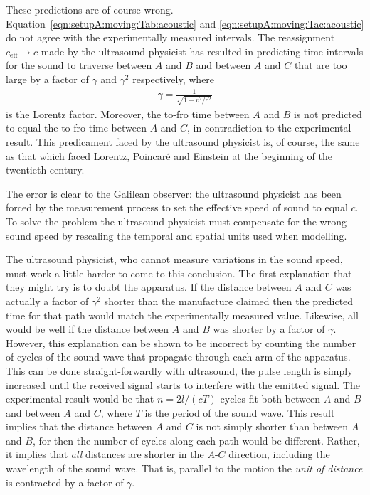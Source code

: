 \documentclass[10pt, fleqn,final,showtrims,oldfontcommands, article,a4paper,oneside]{memoir} %
\newcommand{\eqnref}[1]{\ref{eqn:#1}}
\newcommand{\lr}[1]{\left( #1 \right)}
\newcommand{\Poincare}{Poincar{\'e}\xspace}
\newcommand{\eff}{{\textrm{eff}}}
\begin{document}
These predictions are of course wrong.
Equation~\ref{eqn:setupA:moving:Tab:acoustic} and \ref{eqn:setupA:moving:Tac:acoustic} do not agree with the
experimentally measured intervals.
The reassignment $c_\eff \rightarrow c$ made by the ultrasound physicist 
has resulted in predicting time intervals for the sound to traverse between $A$ and $B$ and between $A$ and $C$ that are too large
by a factor of $\gamma$ and $\gamma^2$ respectively,
where 
\begin{align}
  \gamma = \frac{1}{\sqrt{1-v^2/c^2}}
  \label{eqn:gamma}
\end{align}
is the Lorentz factor.
Moreover, the to-fro time between $A$ and $B$ is not predicted to equal  the to-fro time between $A$ and $C$,
in contradiction to the  experimental result.
This predicament faced by the ultrasound physicist  is, of course, the same as that which faced Lorentz, \Poincare and Einstein at the beginning  of the twentieth century.



The error is clear to the Galilean observer:
the ultrasound physicist has been forced by the measurement process to  set the effective speed of sound to equal $c$.
To solve the problem the ultrasound physicist  must  compensate for the wrong sound speed by rescaling the temporal and spatial units  used when modelling.

The ultrasound physicist, who cannot measure variations in the sound speed,
must work a little harder to come to this conclusion.
The first explanation that they might try  is to doubt the apparatus.
If the distance between $A$ and $C$  was actually a factor of  $\gamma^2$ shorter than the manufacture claimed then the predicted time for that path would match the 
experimentally measured value.
Likewise, all would be well if the distance between $A$ and $B$  was shorter by a factor of $\gamma$.
However, this explanation can be shown to be incorrect by  counting  the number of cycles of the sound wave that propagate through each arm of the apparatus.
This can be done straight-forwardly with ultrasound,
the  pulse length is simply increased until the received signal starts to interfere with the emitted signal.
The experimental result would be that  $n = 2l/\lr{cT}$ cycles fit both  between  $A$ and $B$ and between $A$ and $C$, where $T$ is the period of the sound wave.
This result implies that the distance between $A$ and $C$ is not simply shorter than between $A$ and $B$, %
for then the number of cycles along each path would be different.
Rather, it implies that {\em all} distances are shorter in the $A$-$C$ direction, including the wavelength of the sound wave.
That is, parallel to the motion the {\em   unit of distance} is contracted  by a factor of $\gamma$.
\end{document}
